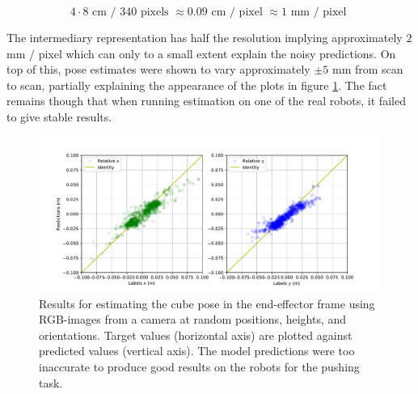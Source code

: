\begin{equation}
    4 \cdot 8 \text{ cm / } 340 \text{ pixels } \approx 0.09 \text{ cm / pixel } \approx 1 \text{ mm / pixel }
\end{equation}

The intermediary representation has half the resolution implying approximately
$2$ mm / pixel which can only to a small extent explain the noisy predictions.
On top of this, pose estimates were shown to vary approximately $\pm 5$ mm from
scan to scan, partially explaining the appearance of the plots in figure
\ref{fig:relpose_end2end_results}. The fact remains though that when running
estimation on one of the real robots, it failed to give stable results.

\begin{figure}[h!]
    \centering
    \includegraphics[width=1.0 \textwidth]{res/results_relative_pose_end2end.pdf}

    \caption{Results for estimating the cube pose in the end-effector frame using
    RGB-images from a camera at random positions, heights, and orientations. Target values
    (horizontal axis) are plotted against predicted values (vertical axis). The model
    predictions were too inaccurate to produce good results on the robots for the
    pushing task.}

    \label{fig:relpose_end2end_results}
    
\end{figure}

